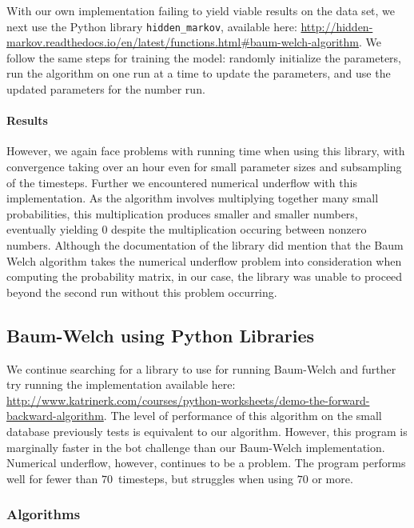 \documentclass[twoside]{article}
\begin{document}
With our own implementation failing to yield viable results on the data set, we next use the Python library \texttt{\small hidden\_markov}, available here: {\small\url{http://hidden-markov.readthedocs.io/en/latest/functions.html#baum-welch-algorithm}}.
We follow the same steps for training the model: randomly initialize the parameters, run the algorithm on one run at a time to update the parameters, and use the updated parameters for the number run.

\paragraph{Results}

However, we again face problems with running time when using this library, with convergence taking over an hour even for small parameter sizes and subsampling of the timesteps.
Further we encountered numerical underflow with this implementation.
As the algorithm involves multiplying together many small probabilities, this multiplication produces smaller and smaller numbers, eventually yielding $0$ despite the multiplication occuring between nonzero numbers.
Although the documentation of the library did mention that the Baum Welch algorithm takes the numerical underflow problem into consideration when computing the probability matrix, in our case, the library was unable to proceed beyond the second run without this problem occurring.


\subsection{Baum-Welch using Python Libraries}\label{sec:baum-welch-using}
We continue searching for a library to use for running Baum-Welch and further try running the implementation available here:\\ {\footnotesize\url{http://www.katrinerk.com/courses/python-worksheets/demo-the-forward-backward-algorithm}}.
The level of performance of this algorithm on the small database previously tests is equivalent to our algorithm.
However, this program is marginally faster in the bot challenge than our Baum-Welch implementation.
Numerical underflow, however, continues to be a problem.
The program performs well for fewer than $\num{70}$~timesteps, but struggles when using $\num{70}$ or more.

\subsubsection{Algorithms}\label{sec:algorithms-python-external-underflow}
\end{document}
